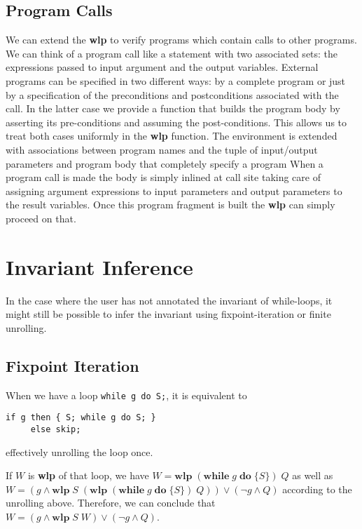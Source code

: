 \documentclass[]{scrartcl}
\newcommand{\WHILE}[2]{\ensuremath{\mathbf{while}\;#1\;\mathbf{do}\;\{#2\}}}
\newcommand{\WLP}[2]{\ensuremath{\mathbf{wlp}\;#1\;#2}}
\begin{document}
\subsection{Program Calls}

We can extend the \textbf{wlp} to verify programs which contain calls to other programs.
We can think of a program call like a statement with two associated sets:
the expressions passed to input argument and the output variables.
External programs can be specified in two different ways: by a complete program or
just by a specification of the preconditions and postconditions associated with
the call.
In the latter case we provide a function that builds the program body by asserting
its pre-conditions and assuming the post-conditions.
This allows us to treat both cases uniformly in the \textbf{wlp} function.
The environment is extended with associations between program names and the
tuple of input/output parameters and program body that completely specify a program
When a program call is made the body is simply inlined at call site taking care
of assigning argument expressions to input parameters and output parameters to the result variables.
Once this program fragment is built the \textbf{wlp} can simply proceed on that.

\section{Invariant Inference}

In the case where the user has not annotated the invariant of while-loops,
it might still be possible to infer the invariant using fixpoint-iteration
or finite unrolling.

\subsection{Fixpoint Iteration}

When we have a loop \lstinline|while g do S;|, it is equivalent to
\begin{lstlisting}
if g then { S; while g do S; }
     else skip;
\end{lstlisting}
effectively unrolling the loop once.

If $W$ is \textbf{wlp} of that loop, we have $W = \WLP{(\WHILE{g}{S})}{Q}$ as well as
$W = (g \land \WLP{S}{(\WLP{(\WHILE{g}{S})}{Q})}) \lor (\neg g \land Q)$ according to the unrolling above.
Therefore, we can conclude that $W = (g \land \WLP{S}{W}) \lor (\neg g \land Q)$.
\end{document}
